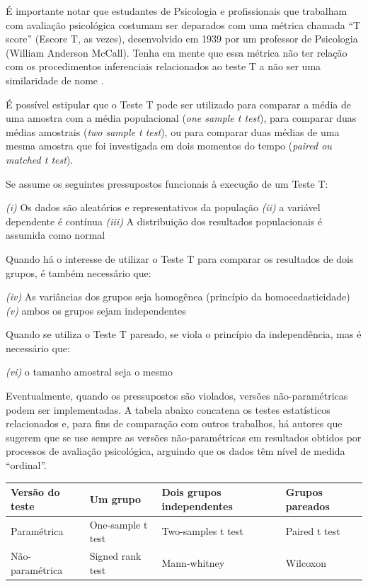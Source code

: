 \documentclass[
]{book}
\begin{document}
É importante notar que estudantes de Psicologia e profissionais que trabalham com avaliação psicológica costumam ser deparados com uma métrica chamada ``T score'' (Escore T, as vezes), desenvolvido em 1939 por um professor de Psicologia (William Anderson McCall). Tenha em mente que essa métrica não ter relação com os procedimentos inferenciais relacionados ao teste T a não ser uma similaridade de nome \citep{McCall1939, Krus1977}.

É possível estipular que o Teste T pode ser utilizado para comparar a média de uma amostra com a média populacional (\emph{one sample t test}), para comparar duas médias amostrais (\emph{two sample t test}), ou para comparar duas médias de uma mesma amostra que foi investigada em dois momentos do tempo (\emph{paired ou matched t test}).

Se assume os seguintes pressupostos funcionais à execução de um Teste T:

\emph{(i)} Os dados são aleatórios e representativos da população
\emph{(ii)} a variável dependente é contínua
\emph{(iii)} A distribuição dos resultados populacionais é assumida como normal

Quando há o interesse de utilizar o Teste T para comparar os resultados de dois grupos, é também necessário que:

\emph{(iv)} As variâncias dos grupos seja homogênea (princípio da homocedasticidade)
\emph{(v)} ambos os grupos sejam independentes

Quando se utiliza o Teste T pareado, se viola o princípio da independência, mas é necessário que:

\emph{(vi)} o tamanho amostral seja o mesmo

Eventualmente, quando os pressupostos são violados, versões não-paramétricas podem ser implementadas. A tabela abaixo concatena os testes estatísticos relacionados e, para fins de comparação com outros trabalhos, há autores que sugerem que se use sempre as versões não-paramétricas em resultados obtidos por processos de avaliação psicológica, arguindo que os dados têm nível de medida ``ordinal''.

\begin{longtable}[]{@{}llll@{}}
\toprule
Versão do teste & Um grupo & Dois grupos independentes & Grupos pareados\tabularnewline
\midrule
\endhead
Paramétrica & One-sample t test & Two-samples t test & Paired t test\tabularnewline
Não-paramétrica & Signed rank test & Mann-whitney & Wilcoxon\tabularnewline
\bottomrule
\end{longtable}
\end{document}
